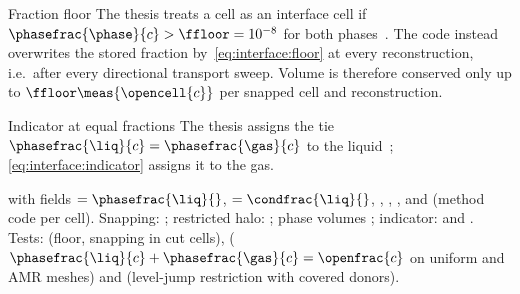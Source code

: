 \begin{deviation}{Fraction floor}\label{dev:interface:floor}
The thesis treats a cell as an interface cell if
$\phasefrac{\phase}{c}>\ffloor=10^{-8}$ for both phases~. The
code instead overwrites the stored fraction by~\cref{eq:interface:floor} at
every reconstruction, i.e.\ after every directional transport sweep. Volume is
therefore conserved only up to $\ffloor\meas{\opencell{c}}$ per snapped cell and
reconstruction.
\end{deviation}

\begin{deviation}{Indicator at equal fractions}
The thesis assigns the tie $\phasefrac{\liq}{c}=\phasefrac{\gas}{c}$ to the
liquid~; \cref{eq:interface:indicator} assigns it to the gas.
\end{deviation}

\begin{implnote}
with fields  $=\phasefrac{\liq}{}$, 
$=\condfrac{\liq}{}$, , , ,
 and  (method code per cell). Snapping:
;
restricted halo:
;
phase volumes
;
indicator:  and
. Tests:
 (floor, snapping
in cut cells),
($\phasefrac{\liq}{c}+\phasefrac{\gas}{c}=\openfrac{c}$ on uniform and AMR meshes) and
(level-jump restriction with covered donors).
\end{implnote}

